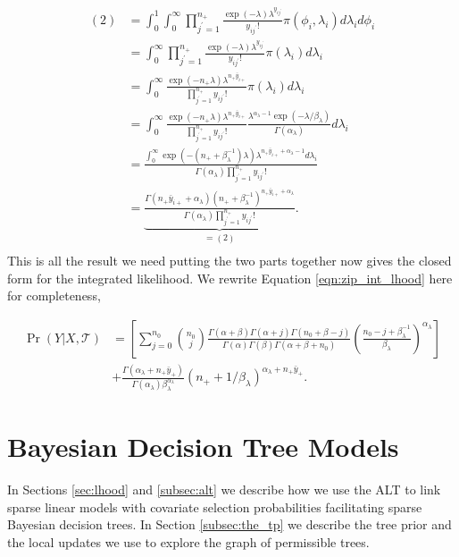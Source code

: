  \begin{align*}
 (2) &= \int_0^1\int_0^\infty\prod_{j^\prime=1}^{n_+}\frac{\exp{(-\lambda)}\lambda^{y_{ij^\prime}} }{y_{ij^\prime}!}\pi(\phi_i,\lambda_i )d\lambda_id\phi_i \\
 &= \int_0^\infty \prod_{j^\prime=1}^{n_+}\frac{\exp{(-\lambda)}\lambda^{y_{ij^\prime}} }{y_{ij^\prime}!}\pi(\lambda_i )d\lambda_i \\
 &= \int_0^\infty\frac{\exp{(-n_+\lambda)}\lambda^{n_+\bar{y}_{i+}} }{\prod_{j^\prime=1}^{n_+}y_{ij^\prime}!}\pi(\lambda_i )d\lambda_i \\
 &= \int_0^\infty\frac{\exp{(-n_+\lambda)}\lambda^{n_+\bar{y}_{i+}} }{\prod_{j^\prime=1}^{n_+}y_{ij^\prime}!}\frac{\lambda^{\alpha_{\lambda}-1}\exp{(-\lambda/\beta_{\lambda})}}{\Gamma(\alpha_{\lambda})}d\lambda_i \\
 &= \frac{\int_0^\infty\exp{(-(n_+ +\beta_{\lambda}^{-1})\lambda)}\lambda^{n_+\bar{y}_{i+} +\alpha_{\lambda}-1} d\lambda_i}{\Gamma(\alpha_{\lambda})\prod_{j^\prime=1}^{n_+}y_{ij^\prime}!} \\
 &= \underbrace{\frac{\Gamma(n_+\bar{y}_{i+}+\alpha_{\lambda})(n_+ +\beta_{\lambda}^{-1})^{n_+\bar{y}_{i+}+\alpha_{\lambda}}}{\Gamma(\alpha_{\lambda})\prod_{j^\prime=1}^{n_+}y_{ij^\prime}!}}_{=(2)}. \\
 \end{align*}
This is all the result we need putting the two parts together now gives the closed form for the integrated likelihood. We rewrite Equation \ref{eqn:zip_int_lhood} here for completeness, 

\begin{align}\nonumber
 \Pr(Y\vert X, \mathcal{T})& = \left[\sum_{j=0}^{n_0} {n_0 \choose j}\frac{\Gamma(\alpha+\beta)\Gamma(\alpha+j)\Gamma(n_0+\beta-j)}{\Gamma(\alpha)\Gamma(\beta)\Gamma(\alpha+\beta+n_0)}\left(\frac{n_0-j+\beta_{\lambda}^{-1}}{\beta_{\lambda}}\right)^{\alpha_{\lambda}} \right] \\ \nonumber
 & + \frac{\Gamma(\alpha_{\lambda}+n_+\bar{y}_+)}{\Gamma(\alpha_{\lambda})\beta_{\lambda}^{\alpha_{\lambda}}}\left(n_+ + 1/\beta_{\lambda} \right)^{\alpha_{\lambda}+n_+\bar{y}_+}.
\end{align}

\newpage

\chapter{Bayesian Decision Tree Models}\label{sec:Model}

In Sections \ref{sec:lhood} and \ref{subsec:alt} we describe how we use the ALT to link sparse linear models with covariate selection probabilities facilitating sparse Bayesian decision trees. In Section \ref{subsec:the_tp} we describe the tree prior and the local updates we use to explore the graph of permissible trees. %

